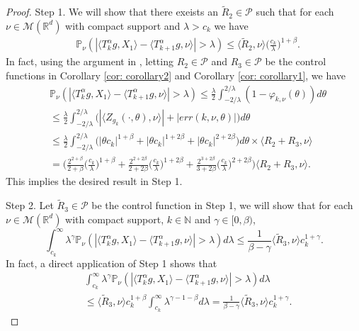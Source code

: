 \documentclass[12pt, a4paper]{amsart}
\theoremstyle{definition}
\numberwithin{equation}{section}
\begin{document}
\begin{proof}
    Step 1. We will show that there exeists an $\tilde R_2 \in \mathcal P$ such that for each $\nu \in \mathcal M(\mathbb R^d)$ with compact support and $\lambda > c_k$ we have
\begin{align} 
    &\mathbb{P}_{\nu}(|\langle T_k^{\alpha}g, X_1\rangle-\langle T_{k+1}^{\alpha}g,\nu\rangle|>\lambda)
    \leq \langle \tilde R_2,\nu\rangle \Big(\frac{c_k}{\lambda}\Big)^{1+\beta}.
\end{align}
    In fact, using the argument in \cite[Proof of Theorem 3.3.6]{Durrett2010Probability}, letting $R_2 \in \mathcal P$ and $R_3 \in \mathcal P$ be the control functions in Corollary \ref{cor: corollary2} and Corollary \ref{cor: corollary1}, we have
\begin{align} 
    &\mathbb{P}_{\nu}(|\langle T_k^{\alpha}g, X_1\rangle-\langle T_{k+1}^{\alpha}g,\nu\rangle|>\lambda)
    \leq \frac{\lambda}{2}\int_{-2/\lambda}^{2/\lambda}(1-\varphi_{k,\nu}(\theta))d\theta
    \\&\leq \frac{\lambda}{2}\int_{-2/\lambda}^{2/\lambda}\big(|\langle Z_{g_k}(\cdot,\theta),\nu\rangle|+|err(k,\nu,\theta)|\big)d\theta
    \\&\leq \frac{\lambda}{2}\int_{-2/\lambda}^{2/\lambda}\big(|\theta c_k|^{1+\beta}+|\theta c_k|^{1+2\beta}+ |\theta c_k|^{2+2\beta}\big)d\theta \times \langle R_2+R_3,\nu\rangle
    \\& = \bigg(\frac{2^{2+\beta}}{2+\beta}\Big(\frac{c_k}{\lambda}\Big)^{1+\beta}+\frac{2^{2+2\beta}}{2+2\beta}\Big(\frac{c_k}{\lambda}\Big)^{1+2\beta} + \frac{2^{3+2\beta}}{3+2\beta}\Big(\frac{c_k}{\lambda}\Big)^{2+2\beta}\bigg) \langle R_2+R_3,\nu\rangle.
\end{align}
    This implies the desired result in Step 1.

    Step 2. Let $\tilde R_3\in \mathcal P$ be the control function in Step 1, we will show that for each $\nu\in \mathcal M(\mathbb R^d)$ with compact support, $k\in \mathbb N$ and $\gamma \in [0,\beta)$,
\[
    \int_{c_k}^\infty \lambda^{\gamma} \mathbb P_\nu(|\langle T_k^\alpha g,X_1\rangle - \langle T_{k+1}^\alpha g, \nu\rangle|> \lambda) d\lambda
    \leq \frac{1}{\beta-\gamma} \langle \tilde R_3,\nu\rangle c_k^{1+\gamma}.
\]
    In fact, a direct application of Step 1 shows that
\begin{align}      
    &\int_{c_k}^\infty \lambda^{\gamma} \mathbb P_\nu(|\langle T_k^\alpha g,X_1\rangle - \langle T_{k+1}^\alpha g, \nu\rangle|> \lambda) d\lambda
    \\&\leq \langle \tilde R_3,\nu \rangle c_k^{1+\beta}\int_{c_k}^\infty \lambda^{\gamma-1-\beta}d\lambda
    = \frac{1}{\beta-\gamma}\langle \tilde R_3,\nu \rangle c_k^{1+\gamma}.
\end{align}


\end{proof}
\end{document}
